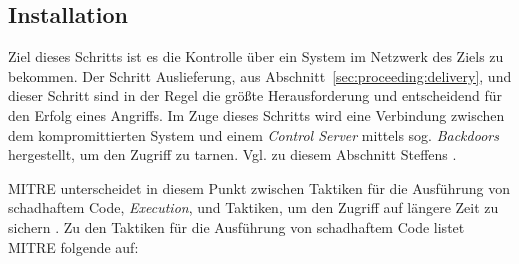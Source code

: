 \documentclass[conference]{IEEEtran}
\begin{document}
\subsection{Installation}

Ziel dieses Schritts ist es die Kontrolle über ein System im Netzwerk des Ziels zu bekommen.
Der Schritt Auslieferung, aus Abschnitt~\ref{sec:proceeding:delivery}, und dieser Schritt sind in der Regel die größte Herausforderung und entscheidend für den Erfolg eines Angriffs.
Im Zuge dieses Schritts wird eine Verbindung zwischen dem kompromittierten System und einem \textit{Control Server} mittels sog. \textit{Backdoors} hergestellt, um den Zugriff zu tarnen.
Vgl. zu diesem Abschnitt Steffens \cite[S.~15]{Steffens2020}.

MITRE \cite{MITREEnterpriseTactics} unterscheidet in diesem Punkt zwischen Taktiken für die Ausführung von schadhaftem Code, \textit{Execution}, und Taktiken, um den Zugriff auf längere Zeit zu sichern \cite{MITREEnterpriseTactics}.
Zu den Taktiken für die Ausführung von schadhaftem Code listet MITRE \cite{MITREExecution} folgende auf:
\end{document}
